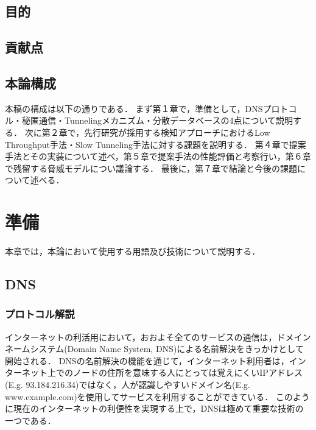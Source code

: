 \documentclass[12pt]{jarticle} %
\begin{document}
\subsection{目的}



\subsection{貢献点}




\subsection{本論構成}
本稿の構成は以下の通りである．
まず第１章で，準備として，DNSプロトコル・秘匿通信・Tunnelingメカニズム・分散データベースの4点について説明する．
次に第２章で，先行研究が採用する検知アプローチにおけるLow Throughput手法・Slow Tunneling手法に対する課題を説明する．
第４章で提案手法とその実装について述べ，第５章で提案手法の性能評価と考察行い，第６章で残留する脅威モデルについ議論する．
最後に，第７章で結論と今後の課題について述べる．



\newpage
\section{準備}
本章では，本論において使用する用語及び技術について説明する．
\subsection{DNS}
\subsubsection{プロトコル解説}
インターネットの利活用において，おおよそ全てのサービスの通信は，ドメインネームシステム(Domain Name System, DNS)による名前解決をきっかけとして開始される．
DNSの名前解決の機能を通じて，インターネット利用者は，インターネット上でのノードの住所を意味する人にとっては覚えにくいIPアドレス(E.g. 93.184.216.34)ではなく，人が認識しやすいドメイン名(E.g. www.example.com)を使用してサービスを利用することができている．
このように現在のインターネットの利便性を実現する上で，DNSは極めて重要な技術の一つである．
\end{document}
